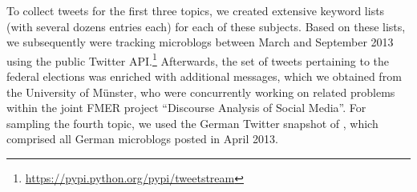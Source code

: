 To collect tweets for the first three topics, we created extensive
keyword lists (with several dozens entries each) for each of these
subjects.  Based on these lists, we subsequently were tracking
microblogs between March and September 2013 using the public Twitter
API.\footnote{\url{https://pypi.python.org/pypi/tweetstream}}
Afterwards, the set of tweets pertaining to the federal elections was
enriched with additional messages, which we obtained from the
University of M\"unster, who were concurrently working on related
problems within the joint FMER project ``Discourse Analysis of Social
Media''.  For sampling the fourth topic, we used the German Twitter
snapshot of \citet{Scheffler:14}, which comprised all German
microblogs posted in April 2013.






